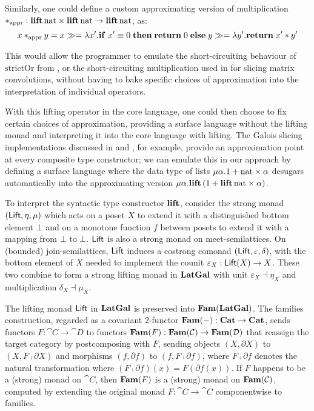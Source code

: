 Similarly, one could define a custom approximating version of multiplication $*_{\text{appr}}:
\mathbf{lift}\,\mathrm{nat} \times \mathbf{lift}\,\mathrm{nat} \to \mathbf{lift}\,\mathrm{nat}$, as:
\[x *_{\text{appr}} y = {x}\gg={\lambda x'.\mathbf{if}\;x' \equiv
0\;\mathbf{then}\;\mathbf{return}\;0\;\mathbf{else}\;{y}\gg={\lambda y'.\mathbf{return}\;x' * y'}}\]

\noindent This would allow the programmer to emulate the short-circuiting behaviour of $\mathrm{strictOr}$
from , or the short-circuiting multiplication used in \citet{perera22} for slicing
matrix convolutions, without having to bake specific choices of approximation into the interpretation of
individual operators.

With this lifting operator in the core language, one could then choose to fix certain choices of
approximation, providing a surface language without the lifting monad and interpreting it into the core
language with lifting. The Galois slicing implementations discussed in \citet{perera12a} and
\citet{ricciotti17}, for example, provide an approximation point at every composite type constructor; we can
emulate this in our approach by defining a surface language where the data type of lists $\mu\alpha.1 +
\mathrm{nat} \times \alpha$ desugars automatically into the approximating version $\mu\alpha.\mathbf{lift}\,(1 +
\mathbf{lift}\,\mathrm{nat} \times \alpha)$.

To interpret the syntactic type constructor $\mathbf{lift}$, consider the strong monad $(\mathsf{Lift}, \eta, \mu)$ which
acts on a poset $X$ to extend it with a distinguished bottom element $\bot$ and on a monotone function $f$
between posets to extend it with a mapping from $\bot$ to $\bot$. $\mathsf{Lift}$ is also a strong monad on
meet-semilattices. On (bounded) join-semilattices, $\mathsf{Lift}$ induces a costrong comonad $(\mathsf{Lift}, \varepsilon,
\delta)$, with the bottom element of $X$ needed to implement the counit $\varepsilon_X: \mathsf{Lift}(X) \to X$. These
two combine to form a strong lifting monad in $\mathbf{LatGal}$ with unit $\varepsilon_X \dashv \eta_X$ and
multiplication $\delta_X \dashv \mu_X$.

The lifting monad $\mathsf{Lift}$ in $\mathbf{LatGal}$ is preserved into $\mathbf{Fam}(\mathbf{LatGal})$. The families construction, regarded
as a covariant 2-functor $\mathbf{Fam}(-): \mathbf{Cat} \to \mathbf{Cat}$, sends functors $F: \cat{C} \to \cat{D}$ to functors
$\mathbf{Fam}(F): \mathbf{Fam}(\mathcal{C}) \to \mathbf{Fam}(\mathcal{D})$ that reassign the target category by postcomposing with $F$,
sending objects $(X, \partial X)$ to $(X, F \comp \partial X)$ and morphisms $(f, \partial f)$ to $(f, F \comp
\partial f)$, where $F \comp \partial f$ denotes the natural transformation where $(F \comp \partial f)(x) =
F(\partial f(x))$. If $F$ happens to be a (strong) monad on $\cat{C}$, then $\mathbf{Fam}(F)$ is a (strong) monad on
$\mathbf{Fam}(\mathcal{C})$, computed by extending the original monad $F: \cat{C} \to \cat{C}$ componentwise to families.


